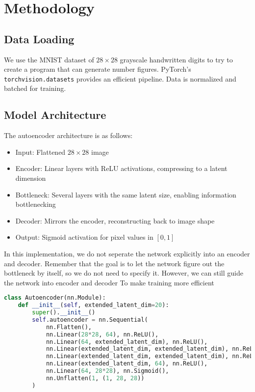 \documentclass[12pt]{article}
\begin{document}
\section{Methodology}

\subsection{Data Loading}
We use the MNIST dataset of $28\times 28$ grayscale handwritten digits to try to create a program that can generate number figures. PyTorch's \texttt{torchvision.datasets} provides an efficient pipeline. Data is normalized and batched for training.

\subsection{Model Architecture}
The autoencoder architecture is as follows:
\begin{itemize}
    \item Input: Flattened $28\times 28$ image
    \item Encoder: Linear layers with ReLU activations, compressing to a latent dimension
    \item Bottleneck: Several layers with the same latent size, enabling information bottlenecking
    \item Decoder: Mirrors the encoder, reconstructing back to image shape
    \item Output: Sigmoid activation for pixel values in $[0,1]$
\end{itemize}

In this implementation, we do not seperate the network explicitly into an encoder and decoder. Remember that the goal is to let the network figure out the bottleneck by itself, so we do not need to specify it. However, we can still guide the network into encoder and decoder To make training more efficient

\begin{lstlisting}[language=Python,caption={Autoencoder Definition}]
class Autoencoder(nn.Module):
    def __init__(self, extended_latent_dim=20):
        super().__init__()
        self.autoencoder = nn.Sequential(
            nn.Flatten(),
            nn.Linear(28*28, 64), nn.ReLU(),
            nn.Linear(64, extended_latent_dim), nn.ReLU(),
            nn.Linear(extended_latent_dim, extended_latent_dim), nn.ReLU(),
            nn.Linear(extended_latent_dim, extended_latent_dim), nn.ReLU(),
            nn.Linear(extended_latent_dim, 64), nn.ReLU(),
            nn.Linear(64, 28*28), nn.Sigmoid(),
            nn.Unflatten(1, (1, 28, 28))
        )
\end{lstlisting}
\end{document}
